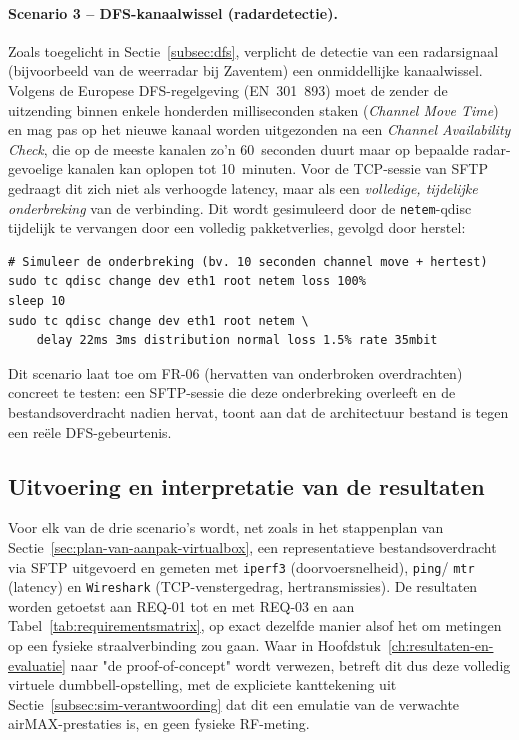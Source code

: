 \paragraph{Scenario 3 -- DFS-kanaalwissel (radardetectie).} Zoals toegelicht in
Sectie~\ref{subsec:dfs}, verplicht de detectie van een radarsignaal (bijvoorbeeld van de
weerradar bij Zaventem) een onmiddellijke kanaalwissel. Volgens de Europese
DFS-regelgeving (EN~301~893) moet de zender de uitzending binnen enkele honderden
milliseconden staken (\textit{Channel Move Time}) en mag pas op het nieuwe kanaal
worden uitgezonden na een \textit{Channel Availability Check}, die op de meeste kanalen
zo'n 60~seconden duurt maar op bepaalde radar-gevoelige kanalen kan oplopen tot
10~minuten. Voor de TCP-sessie van SFTP gedraagt dit zich niet als verhoogde latency,
maar als een \emph{volledige, tijdelijke onderbreking} van de verbinding. Dit wordt
gesimuleerd door de \texttt{netem}-qdisc tijdelijk te vervangen door een volledig
pakketverlies, gevolgd door herstel:
\begin{verbatim}
# Simuleer de onderbreking (bv. 10 seconden channel move + hertest)
sudo tc qdisc change dev eth1 root netem loss 100%
sleep 10
sudo tc qdisc change dev eth1 root netem \
    delay 22ms 3ms distribution normal loss 1.5% rate 35mbit
\end{verbatim}
Dit scenario laat toe om FR-06 (hervatten van onderbroken overdrachten) concreet te
testen: een SFTP-sessie die deze onderbreking overleeft en de bestandsoverdracht
nadien hervat, toont aan dat de architectuur bestand is tegen een reële DFS-gebeurtenis.

\subsection{Uitvoering en interpretatie van de resultaten}%
\label{subsec:sim-uitvoering}

Voor elk van de drie scenario's wordt, net zoals in het stappenplan van
Sectie~\ref{sec:plan-van-aanpak-virtualbox}, een representatieve bestandsoverdracht via
SFTP uitgevoerd en gemeten met \texttt{iperf3} (doorvoersnelheid), \texttt{ping}/
\texttt{mtr} (latency) en \texttt{Wireshark} (TCP-venstergedrag, hertransmissies). De
resultaten worden getoetst aan REQ-01 tot en met REQ-03 en aan
Tabel~\ref{tab:requirementsmatrix}, op exact dezelfde manier alsof het om metingen op
een fysieke straalverbinding zou gaan. Waar in Hoofdstuk~\ref{ch:resultaten-en-evaluatie}
naar "de proof-of-concept" wordt verwezen, betreft dit dus deze volledig virtuele
dumbbell-opstelling, met de expliciete kanttekening uit
Sectie~\ref{subsec:sim-verantwoording} dat dit een emulatie van de verwachte
airMAX-prestaties is, en geen fysieke RF-meting.
